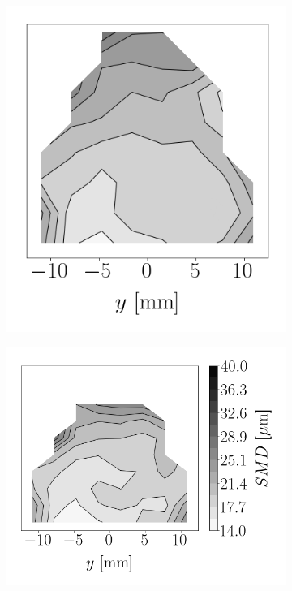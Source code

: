 \begin{figure}[t!]
\begin{subfigure}[b]{0.2\textwidth}
\end{subfigure}
\hspace*{0.02in}
\begin{subfigure}[b]{0.2\textwidth}
	\flushleft
   \includegraphics[scale=0.4]{./part2_developments/figures_ch6_lagrangian_JICF/apte_model_calibration_u_vw_lognorm/maps/k1_0p10_k2_1p0_SMD}
\end{subfigure}
\hspace*{0.02in}
\begin{subfigure}[b]{0.2\textwidth}
	\flushleft
   \includegraphics[scale=0.4]{./part2_developments/figures_ch6_lagrangian_JICF/apte_model_calibration_u_vw_lognorm/maps/k1_0p20_k2_1p0_SMD}
\end{subfigure}


\end{figure}
